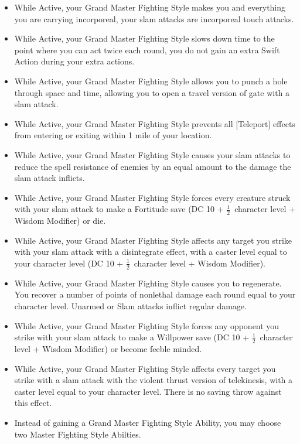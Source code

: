 \documentclass[10pt]{article}
\newcommand{\itemspace}[0]{\setlength{\itemsep}{-1mm}}
\newcommand{\half}[0]{\ensuremath{\frac{1}{2}}}
\begin{document}
\begin{itemize}\itemspace
    \item While Active, your Grand Master Fighting Style makes you and everything you are carrying incorporeal, your slam attacks are incorporeal touch attacks.
    \item While Active, your Grand Master Fighting Style slows down time to the point where you can act twice each round, you do not gain an extra Swift Action during your extra actions.
    \item While Active, your Grand Master Fighting Style allows you to punch a hole through space and time, allowing you to open a travel version of gate with a slam attack.
    \item While Active, your Grand Master Fighting Style prevents all [Teleport] effects from entering or exiting within 1 mile of your location.
    \item While Active, your Grand Master Fighting Style causes your slam attacks to reduce the spell resistance of enemies by an equal amount to the damage the slam attack inflicts.
    \item While Active, your Grand Master Fighting Style forces every creature struck with your slam attack to make a Fortitude save (DC 10 + \half\  character level + Wisdom Modifier) or die.
    \item While Active, your Grand Master Fighting Style affects any target you strike with your slam attack with a disintegrate effect, with a caster level equal to your character level (DC 10 + \half\  character level + Wisdom Modifier).
    \item While Active, your Grand Master Fighting Style causes you to regenerate. You recover a number of points of nonlethal damage each round equal to your character level. Unarmed or Slam attacks inflict regular damage.
    \item While Active, your Grand Master Fighting Style forces any opponent you strike with your slam attack to make a Willpower save (DC 10 + \half\  character level + Wisdom Modifier) or become feeble minded.
    \item While Active, your Grand Master Fighting Style affects every target you strike with a slam attack with the violent thrust version of telekinesis, with a caster level equal to your character level. There is no saving throw against this effect.
    \item Instead of gaining a Grand Master Fighting Style Ability, you may choose two Master Fighting Style Abilties.
\end{itemize}
\end{document}
